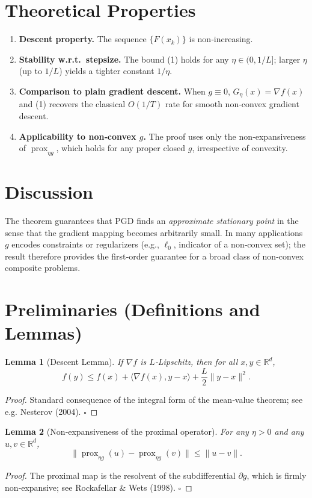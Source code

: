 \documentclass{article}
\newtheorem{lemma}{Lemma}
\newcommand{\prox}{\operatorname{prox}}
\newcommand{\grad}{\nabla}
\newcommand{\R}{\mathbb{R}}
\begin{document}
\section*{Theoretical Properties}
\begin{enumerate}[label=\arabic*.]
\item \textbf{Descent property.} The sequence $\{F(x_{k})\}$ is non‑increasing.
\item \textbf{Stability w.r.t.\ stepsize.} The bound (1) holds for any $\eta\in(0,1/L]$; larger $\eta$ (up to $1/L$) yields a tighter constant $1/\eta$.
\item \textbf{Comparison to plain gradient descent.} When $g\equiv0$, $G_{\eta}(x)=\grad f(x)$ and (1) recovers the classical $O(1/T)$ rate for smooth non‑convex gradient descent.
\item \textbf{Applicability to non‑convex $g$.} The proof uses only the non‑expansiveness of $\prox_{\eta g}$, which holds for any proper closed $g$, irrespective of convexity.
\end{enumerate}

\section*{Discussion}
The theorem guarantees that PGD finds an \emph{approximate stationary point} in the sense that the gradient mapping becomes arbitrarily small. In many applications $g$ encodes constraints or regularizers (e.g., $\ell_{0}$, indicator of a non‑convex set); the result therefore provides the first‑order guarantee for a broad class of non‑convex composite problems.

\newpage

\section*{Preliminaries (Definitions and Lemmas)}
\begin{lemma}[Descent Lemma]\label{lem:descent}
If $\grad f$ is $L$‑Lipschitz, then for all $x,y\in\R^{d}$,
\[
f(y)\le f(x)+\langle\grad f(x),y-x\rangle+\frac{L}{2}\|y-x\|^{2}.
\tag{2}
\]
\end{lemma}
\begin{proof}
Standard consequence of the integral form of the mean‑value theorem; see e.g. Nesterov (2004). \hfill $\square$
\end{proof}

\begin{lemma}[Non‑expansiveness of the proximal operator]\label{lem:nonexp}
For any $\eta>0$ and any $u,v\in\R^{d}$,
\[
\bigl\|\prox_{\eta g}(u)-\prox_{\eta g}(v)\bigr\|\le\|u-v\|.
\tag{3}
\]
\end{lemma}
\begin{proof}
The proximal map is the resolvent of the subdifferential $\partial g$, which is firmly non‑expansive; see Rockafellar \& Wets (1998). \hfill $\square$
\end{proof}
\end{document}
